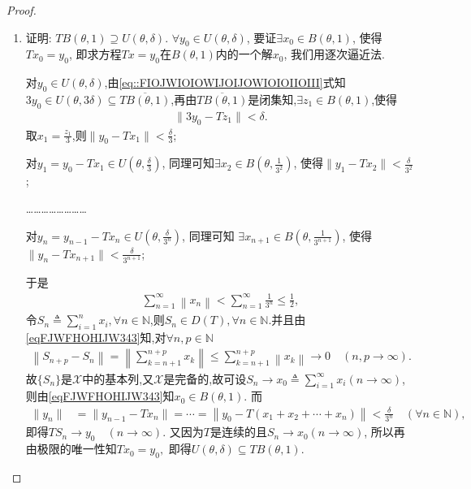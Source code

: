 \documentclass[../../main.tex]{subfiles}%
\begin{document}
\begin{proof}
\begin{enumerate}[(1)]
\item 证明: $TB(\theta,1)\supseteq U(\theta,\delta)$. $\forall y_0\in U(\theta,\delta)$, 要证$\exists x_0\in B(\theta,1)$, 使得$Tx_0=y_0$, 即求方程$Tx=y_0$在$B(\theta,1)$内的一个解$x_0$, 我们用逐次逼近法.

对$y_0\in U(\theta,\delta)$,由\eqref{eq::FIOJWIOIOWIJOIJOWIOIOIIOIII}式知$3y_0\in U(\theta,3\delta)\subseteq \overline{TB(\theta,1)}$,再由$\overline{TB(\theta,1)}$是闭集知,$\exists z_1\in B(\theta,1)$,使得
\begin{align*}
\|3y_0-Tz_1\|<\delta.
\end{align*}
取$x_1=\frac{z_1}{3}$,则$\|y_0-Tx_1\|<\frac{\delta}{3}$;

对$y_1=y_0-Tx_1\in U\left(\theta,\frac{\delta}{3}\right)$, 同理可知$\exists x_2\in B\left(\theta,\frac{1}{3^2}\right)$, 使得$\|y_1-Tx_2\|<\frac{\delta}{3^2}$;

……………………

对$y_n=y_{n-1}-Tx_n\in U\left(\theta,\frac{\delta}{3^n}\right)$, 同理可知 $\exists x_{n+1}\in B\left(\theta,\frac{1}{3^{n+1}}\right)$, 使得$\|y_n-Tx_{n+1}\|<\frac{\delta}{3^{n+1}}$;

于是
\begin{align}\label{eqFJWFHOHIJW343}
\sum_{n=1}^{\infty}{\left\| x_n \right\|}<\sum_{n=1}^{\infty}{\frac{1}{3^n}}\leqslant \frac{1}{2},
\end{align}
令$S_n\triangleq\sum\limits_{i=1}^{n}x_i,\forall n\in\mathbb{N}$,则$S_n\in D(T),\forall n\in \mathbb{N}$.并且由\eqref{eqFJWFHOHIJW343}知,对$\forall n,p\in \mathbb{N}$
\begin{align*}
\left\| S_{n+p}-S_n \right\| =\left\| \sum_{k=n+1}^{n+p}{x_k} \right\| \leqslant \sum_{k=n+1}^{n+p}{\left\| x_k \right\|}\rightarrow 0\quad \left( n,p\rightarrow \infty \right) .
\end{align*}
故$\{S_n\}$是$\mathscr{X}$中的基本列,又$\mathscr{X}$是完备的,故可设$S_n\to x_0\triangleq\sum\limits_{i=1}^{\infty}x_i(n\to\infty)$,则由\eqref{eqFJWFHOHIJW343}知$x_0\in B(\theta,1)$.
而
\begin{align*}
\|y_n\|&=\|y_{n-1}-Tx_n\|=\cdots=\left\|y_0-T(x_1+x_2+\cdots+x_n)\right\|<\frac{\delta}{3^n}\quad(\forall n\in\mathbb{N}),
\end{align*}
即得$TS_n\to y_0\quad(n\to\infty).$
又因为$T$是连续的且$S_n\to x_0(n\to\infty)$, 所以再由极限的唯一性知$Tx_0=y_0,$
即得$U(\theta,\delta)\subseteq TB(\theta,1)$.
\end{enumerate}
\end{proof}
\end{document}
